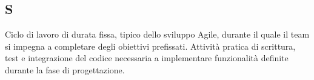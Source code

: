 \begin{center}
\section*{S}
\end{center}
Ciclo di lavoro di durata fissa, tipico dello sviluppo Agile, durante il quale il team si impegna a completare degli obiettivi prefissati.
Attività pratica di scrittura, test e integrazione del codice necessaria a implementare funzionalità definite durante la fase di progettazione.
